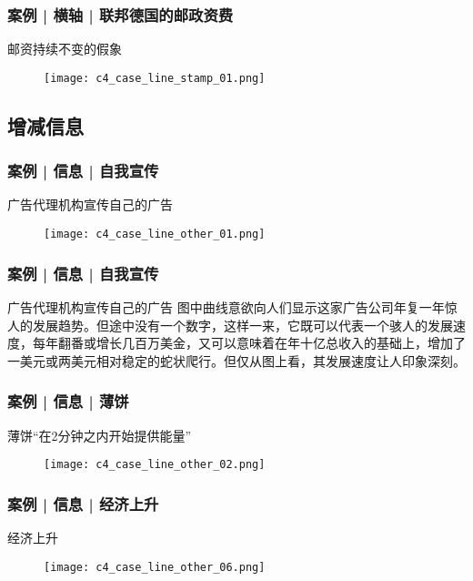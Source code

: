 \begin{frame}
  \frametitle{案例 | 横轴 | 联邦德国的邮政资费}
  \begin{block}{邮资持续不变的假象}
    \begin{figure}
      \centering
      \texttt{[image: c4\_case\_line\_stamp\_01.png]}
    \end{figure}
  \end{block}
\end{frame}

\subsection{增减信息}
\begin{frame}
  \frametitle{案例 | 信息 | 自我宣传}
  \begin{block}{广告代理机构宣传自己的广告}
    \begin{figure}
      \centering
      \texttt{[image: c4\_case\_line\_other\_01.png]}
    \end{figure}
  \end{block}
\end{frame}

\begin{frame}
  \frametitle{案例 | 信息 | 自我宣传}
  \begin{block}{广告代理机构宣传自己的广告}
图中曲线意欲向人们显示这家广告公司年复一年惊人的发展趋势。但途中没有一个数字，这样一来，它既可以代表一个骇人的发展速度，每年翻番或增长几百万美金，又可以意味着在年十亿总收入的基础上，增加了一美元或两美元相对稳定的蛇状爬行。但仅从图上看，其发展速度让人印象深刻。
  \end{block}
\end{frame}

\begin{frame}
  \frametitle{案例 | 信息 | 薄饼}
  \begin{block}{薄饼“在2分钟之内开始提供能量”}
    \begin{figure}
      \centering
      \texttt{[image: c4\_case\_line\_other\_02.png]}
    \end{figure}
  \end{block}
\end{frame}

\begin{frame}
  \frametitle{案例 | 信息 | 经济上升}
  \begin{block}{经济上升}
  \begin{figure}
    \centering
    \texttt{[image: c4\_case\_line\_other\_06.png]}
  \end{figure}
  \end{block}
\end{frame}

